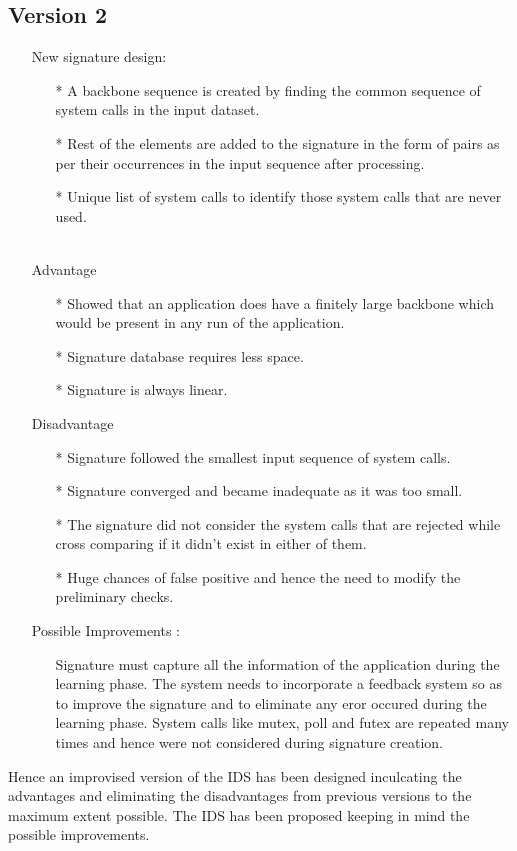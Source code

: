 \subsection{Version 2}
\begin{itemize}
    \item[] {New signature design:}
        \begin{itemize}
            \item[*] A backbone sequence is created by finding the common sequence of system calls in the input dataset.
            \item[*] Rest of the elements are added to the signature in the form of pairs as per their occurrences in the input sequence after processing.
            \item[*] Unique list of system calls to identify those system calls that are never used. \\ \\
        \end{itemize}
\end{itemize}
\begin{itemize}
    \item[] {Advantage}
        \begin{itemize}
            \item[*] Showed that an application does have a finitely large backbone which would be present in any run of the application.
            \item[*] Signature database requires less space.
            \item[*] Signature is always linear.
        \end{itemize}
    \item[] {Disadvantage}
        \begin{itemize}
            \item[*] Signature followed the smallest input sequence of system calls.
            \item[*] Signature converged and became inadequate as it was too small.
            \item[*] The signature did not consider the system calls that are rejected while cross comparing if it didn't exist in either of them.
            \item[*] Huge chances of false positive and hence the need to modify the preliminary checks. \\
        \end{itemize}
    \item[] {Possible Improvements :}
        \begin{itemize}                                        
            \item[] Signature must capture all the information of the
                application during the learning phase. The system needs to incorporate
                a feedback system so as to improve the signature and to eliminate
                any eror occured during the learning phase. System calls like mutex, poll and futex are repeated many times and hence were not considered during signature creation.
        \end{itemize}
\end{itemize}
Hence an improvised version of the IDS has been designed inculcating the
advantages and eliminating the disadvantages from previous versions to the
maximum extent possible. The IDS has been proposed keeping in mind the
possible improvements. 

